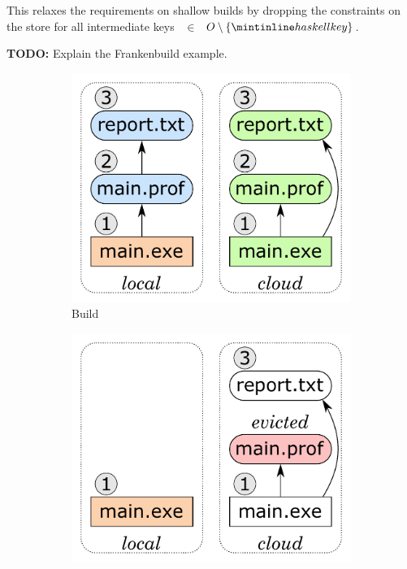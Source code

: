 \noindent
This relaxes the requirements on shallow builds by dropping the constraints on
the  store for all intermediate keys ~$\in$~$O\setminus \{\hs{key}\}$.

\textbf{TODO:} Explain the Frankenbuild example.

\begin{figure}
\vspace{-2mm}
\begin{subfigure}[b]{0.25\linewidth}
\centerline{\includegraphics[scale=0.28]{fig/frankenbuild-example-build.pdf}}
\vspace{-1mm}
\caption{Build }
\end{subfigure}
\begin{subfigure}[b]{0.40\linewidth}
\centerline{\includegraphics[scale=0.28]{fig/frankenbuild-example-clean.pdf}}

\end{subfigure}
\end{figure}
